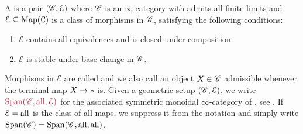 

%
\begin{defn}\label{defn: geometric setup}
A  is a pair $(\mathscr{C}, \mathcal E)$ where $\mathscr{C}$ is an $\infty$-category with admits all finite limits
and $\mathcal E \subseteq \operatorname{Map} (\mathcal C)$ is a class of morphisms
in $\mathscr{C}$, satisfying the following conditions:
\begin{enumerate}[label=(\roman*)]
    \item $\mathcal E$ contains all equivalences and is closed under composition.
    \item $\mathcal E$ is stable under base change in $\mathscr{C}$.
\end{enumerate}
 Morphisms in $\mathcal E$ are called  and we also call
 an object $X\in \mathscr{C}$ admissible whenever the terminal map $X\to \ast$ is.
Given a geometric setup $(\mathscr{C},\mathcal{E})$, we write $\mdef{\Span{\cC, \all, \cE}}$ for
the associated symmetric monoidal $\infty$-category of , see . 
If $\mathcal{E}=\mathrm{all}$ is the class of all maps, we suppress it from the notation and
simply write $\operatorname{\mathrm{Span}}({\mathscr{C}})= \operatorname{\mathrm{Span}}({\mathscr{C},\mathrm{all},\mathrm{all}})$. 
\end{defn}

